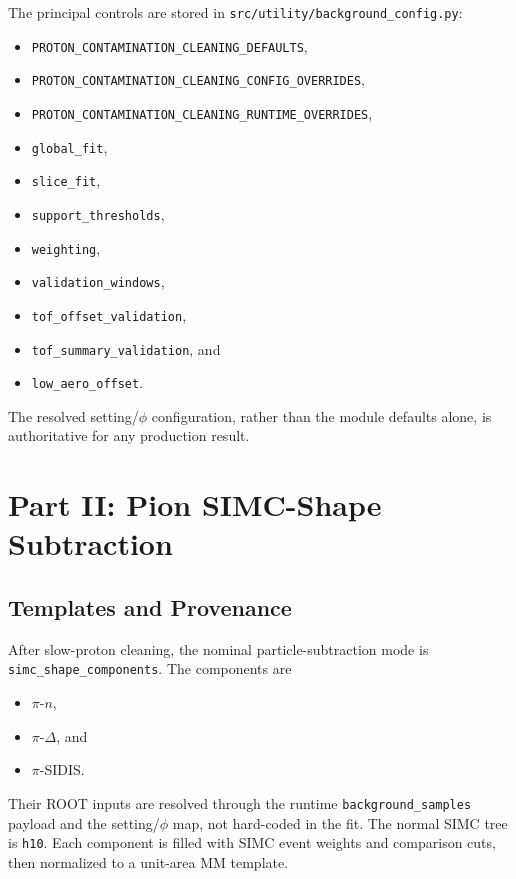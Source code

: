\documentclass[11pt]{article}
\begin{document}
The principal controls are stored in
\texttt{src/utility/background\_config.py}:
\begin{itemize}[leftmargin=2em]
  \item \texttt{PROTON\_CONTAMINATION\_CLEANING\_DEFAULTS},
  \item \texttt{PROTON\_CONTAMINATION\_CLEANING\_CONFIG\_OVERRIDES},
  \item \texttt{PROTON\_CONTAMINATION\_CLEANING\_RUNTIME\_OVERRIDES},
  \item \texttt{global\_fit},
  \item \texttt{slice\_fit},
  \item \texttt{support\_thresholds},
  \item \texttt{weighting},
  \item \texttt{validation\_windows},
  \item \texttt{tof\_offset\_validation},
  \item \texttt{tof\_summary\_validation}, and
  \item \texttt{low\_aero\_offset}.
\end{itemize}
The resolved setting/$\phi$ configuration, rather than the module defaults
alone, is authoritative for any production result.

\section{Part II: Pion SIMC-Shape Subtraction}

\subsection{Templates and Provenance}

After slow-proton cleaning, the nominal particle-subtraction mode is
\texttt{simc\_shape\_components}.  The components are
\begin{itemize}[leftmargin=2em]
  \item $\pi$-$n$,
  \item $\pi$-$\Delta$, and
  \item $\pi$-SIDIS.
\end{itemize}

Their ROOT inputs are resolved through the runtime
\texttt{background\_samples} payload and the setting/$\phi$ map, not
hard-coded in the fit.  The normal SIMC tree is \texttt{h10}.  Each component
is filled with SIMC event weights and comparison cuts, then normalized to a
unit-area MM template.
\end{document}
